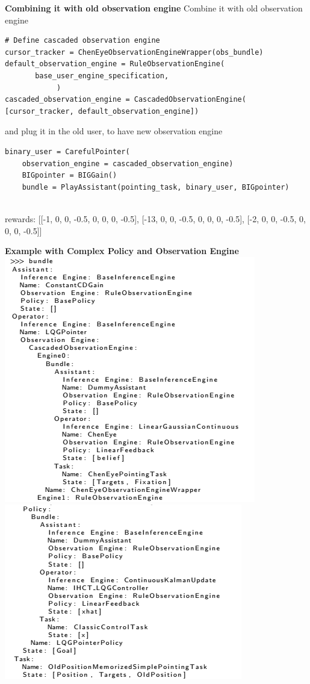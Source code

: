 \documentclass[11pt, xcolor = {dvipsnames}]{beamer}
\begin{document}
\begin{frame}[fragile]{\textbf{Combining it with old observation engine}}
Combine it with old observation engine
\begin{adjustbox}{width=\textwidth}
\lstset{language=Python}
\lstset{frame=lines}
\lstset{basicstyle=\footnotesize}
\begin{lstlisting}
# Define cascaded observation engine
cursor_tracker = ChenEyeObservationEngineWrapper(obs_bundle)
default_observation_engine = RuleObservationEngine(
       base_user_engine_specification,
            )
cascaded_observation_engine = CascadedObservationEngine(
[cursor_tracker, default_observation_engine])

\end{lstlisting}
\end{adjustbox}
and plug it in the old user, to have  new observation engine
\begin{adjustbox}{width=\textwidth}
\lstset{language=Python}
\lstset{frame=lines}
\lstset{basicstyle=\footnotesize}
\begin{lstlisting}
binary_user = CarefulPointer(
	observation_engine = cascaded_observation_engine)
    BIGpointer = BIGGain()
    bundle = PlayAssistant(pointing_task, binary_user, BIGpointer)


\end{lstlisting}
\end{adjustbox}

\vspace{\baselineskip}

rewards:
[[-1, 0, 0, -0.5, 0, 0, 0, -0.5], [-13, 0, 0, -0.5, 0, 0, 0, -0.5], [-2, 0, 0, -0.5, 0, 0, 0, -0.5]]

\end{frame}


\begin{frame}{\textbf{Example with Complex Policy and Observation Engine}}
\includegraphics[width=.49\textwidth]{fig/b_1.png}%
\includegraphics[width=.49\textwidth]{fig/b_2.png}
\end{frame}
\end{document}
